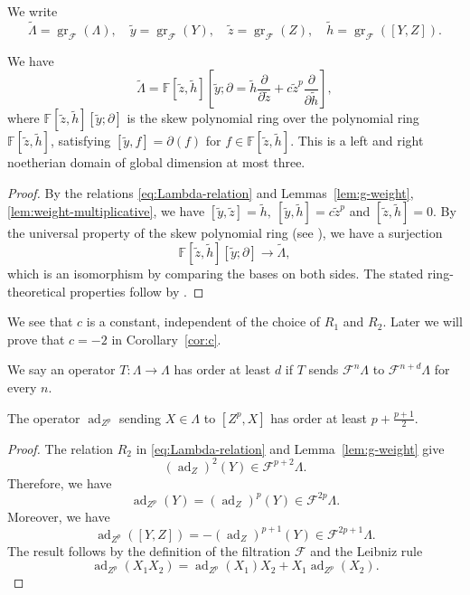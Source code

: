 \documentclass[11pt,a4paper]{article} %
\def\FF{\mathbb{F}}
\def\cF{\mathcal{F}}
\def\ad{\operatorname{ad}}
\def\gr{\operatorname{gr}}
\begin{document}
We write
\[
\widetilde{\Lambda}=\gr_{\cF}(\Lambda),\quad\widetilde{y}=\gr_{\cF}(Y),\quad \widetilde{z}=\gr_{\cF}(Z),\quad
 \widetilde{h}=\gr_{\cF}([Y,Z]).
\]

\begin{proposition}\label{prop:graded-algebra}
We have 
\[
\widetilde{\Lambda}=\FF[\widetilde{z},\widetilde{h}][\widetilde{y};\partial=\widetilde{h}\frac{\partial}{\partial\widetilde{z}}+c\widetilde{z}^p\frac{\partial}{\partial\widetilde{h}}
],
\]
where $\FF[\widetilde{z},\widetilde{h}][\widetilde{y};\partial]$ is the skew polynomial ring over the polynomial ring $\FF[\widetilde{z},\widetilde{h}]$, satisfying $[\widetilde{y},f]=\partial(f)$ for $f\in\FF[\widetilde{z},\widetilde{h}]$.
This is a left and right noetherian domain of global dimension at most three.
\end{proposition}

\begin{proof}
    By the relations \eqref{eq:Lambda-relation} and Lemmas~\ref{lem:g-weight}, \ref{lem:weight-multiplicative}, we have $[\widetilde{y},\widetilde{z}]=\widetilde{h},~[\widetilde{y},\widetilde{h}]=c\widetilde{z}^p$ and $[\widetilde{z},\widetilde{h}]=0$. By the universal property of the skew polynomial ring (see \cite[\S1.2.5]{MR01}), we have a surjection 
    \[
    \FF[\widetilde{z},\widetilde{h}][\widetilde{y};\partial]\longrightarrow\widetilde{\Lambda},
    \]
    which is an isomorphism by comparing the bases on both sides. The stated ring-theoretical properties follow by \cite[Theorem 1.2.9, Theorem 7.5.3]{MR01}.
\end{proof}

\begin{remark}
    We see that $c$ is a constant, independent of the choice of $R_1$ and $R_2$. Later we will prove that $c=-2$ in Corollary~\ref{cor:c}.
\end{remark}

We say an operator $T:\Lambda\to\Lambda$ has order at least $d$ if $T$ sends $\cF^n\Lambda$ to $\cF^{n+d}\Lambda$ for every $n$.

\begin{lemma}\label{lem:ad-order}
    The operator $\ad_{Z^p}$ sending $X\in\Lambda$ to $[Z^p,X]$ has order at least $p+\frac{p+1}{2}$.
\end{lemma}

\begin{proof}
    The relation $R_2$ in \eqref{eq:Lambda-relation} and Lemma~\ref{lem:g-weight} give 
    \[
    (\ad_Z)^2(Y)\in\cF^{p+2}\Lambda.
    \]
    Therefore, we have 
    \[
    \ad_{Z^p}(Y)=(\ad_Z)^p(Y)\in\cF^{2p}\Lambda.
    \]
    Moreover, we have 
    \[
    \ad_{Z^p}([Y,Z])=-(\ad_Z)^{p+1}(Y)\in\cF^{2p+1}\Lambda.
    \]
    The result follows by the definition of the filtration $\cF$ and the Leibniz rule
    \[
    \ad_{Z^p}(X_1X_2)=\ad_{Z^p}(X_1)X_2+X_1\ad_{Z^p}(X_2).
    \]
\end{proof}
\end{document}
